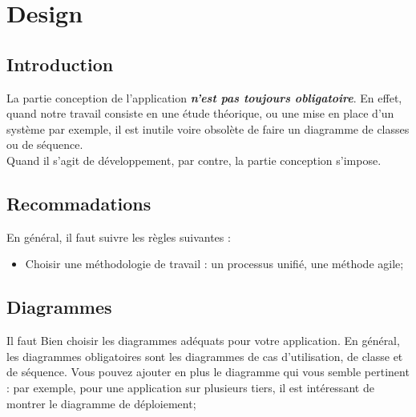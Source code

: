 
\setcounter{chapter}{1}
\chapter{Design}
\minitoc %
\graphicspath{{Chapitre2/figures/}}


\pagestyle{fancy}
\fancyhf{}
\fancyhead[R]{\bfseries\rightmark}
\fancyfoot[R]{\thepage}
\renewcommand{\headrulewidth}{0.5pt}
\renewcommand{\footrulewidth}{0pt}
\renewcommand{\chaptermark}[1]{\markboth{\MakeUppercase{\chaptername~\thechapter. #1 }}{}}
\renewcommand{\sectionmark}[1]{\markright{\thechapter.\thesection~ #1}}

\begin{spacing}{1.2}
\section*{Introduction}
La partie conception de l'application \textbf{\textsl{n'est pas toujours obligatoire}}. En effet, quand notre travail consiste en une étude théorique, ou une mise en place d'un système par exemple, 
il est inutile voire obsolète de faire un diagramme de classes ou de séquence.\\
Quand il s'agit de développement, par contre, la partie conception s'impose. 
\section{Recommadations}
En général, 
il faut suivre les règles suivantes :
\begin{itemize}
	\item Choisir une méthodologie de travail : un processus unifié, une méthode agile;
\end{itemize}
\section{Diagrammes}
Il faut Bien choisir les diagrammes adéquats pour votre application. En général, les
diagrammes obligatoires sont les diagrammes de cas d'utilisation, de classe et de 
séquence. Vous pouvez ajouter en plus le diagramme qui vous semble pertinent :
par exemple, pour une application sur plusieurs tiers, il est intéressant de
montrer le diagramme de déploiement;
\begin{itemize}


\end{itemize}
\end{spacing}
